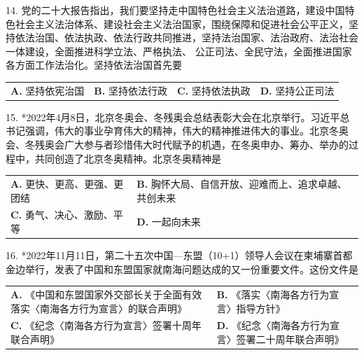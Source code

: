 \documentclass[UTF8,11pt]{ctexart}
\begin{document}
14. 党的二十大报告指出，我们要坚持走中国特色社会主义法治道路，建设中国特色社会主义法治体系、建设社会主义法治国家，围绕保障和促进社会公平正义，坚持依法治国、依法执政、依法行政共同推进，坚持法治国家、法治政府、法治社会一体建设，全面推进科学立法、严格执法、 公正司法、全民守法，全面推进国家各方面工作法治化。坚持依法治国首先要


\begin{center}\begin{tabular}{>{\raggedright\arraybackslash}p{\dimexpr(\linewidth-8\tabcolsep)/4\relax}>{\raggedright\arraybackslash}p{\dimexpr(\linewidth-8\tabcolsep)/4\relax}>{\raggedright\arraybackslash}p{\dimexpr(\linewidth-8\tabcolsep)/4\relax}>{\raggedright\arraybackslash}p{\dimexpr(\linewidth-8\tabcolsep)/4\relax}}
\textbf{A.} 坚持依宪治国 & \textbf{B.} 坚持依法行政 & \textbf{C.} 坚持依法执政 & \textbf{D.} 坚持公正司法\\[.35em]\end{tabular}\end{center}

15. *2022年4月8日，北京冬奥会、冬残奥会总结表彰大会在北京举行。习近平总书记强调，伟大的事业孕育伟大的精神，伟大的精神推进伟大的事业。北京冬奥会、冬残奥会广大参与者珍惜伟大时代赋予的机遇，在冬奥申办、筹办、举办的过程中，共同创造了北京冬奥精神。北京冬奥精神是


\begin{center}\begin{tabular}{>{\raggedright\arraybackslash}p{\dimexpr(\linewidth-4\tabcolsep)/2\relax}>{\raggedright\arraybackslash}p{\dimexpr(\linewidth-4\tabcolsep)/2\relax}}
\textbf{A.} 更快、更高、更强、更团结 & \textbf{B.} 胸怀大局、自信开放、迎难而上、追求卓越、共创未来\\[.35em]
\textbf{C.} 勇气、决心、激励、平等 & \textbf{D.} 一起向未来\\[.35em]\end{tabular}\end{center}

16. *2022年11月11日，第二十五次中国—东盟（10+1）领导人会议在柬埔寨首都金边举行，发表了中国和东盟国家就南海问题达成的又一份重要文件。这份文件是


\begin{center}\begin{tabular}{>{\raggedright\arraybackslash}p{\dimexpr(\linewidth-4\tabcolsep)/2\relax}>{\raggedright\arraybackslash}p{\dimexpr(\linewidth-4\tabcolsep)/2\relax}}
\textbf{A.} 《中国和东盟国家外交部长关于全面有效落实〈南海各方行为宣言〉的联合声明》 & \textbf{B.} 《落实〈南海各方行为宣言〉指导方针》\\[.35em]
\textbf{C.} 《纪念〈南海各方行为宣言〉签署十周年联合声明》 & \textbf{D.} 《纪念〈南海各方行为宣言〉签署二十周年联合声明》\\[.35em]\end{tabular}\end{center}
\end{document}
